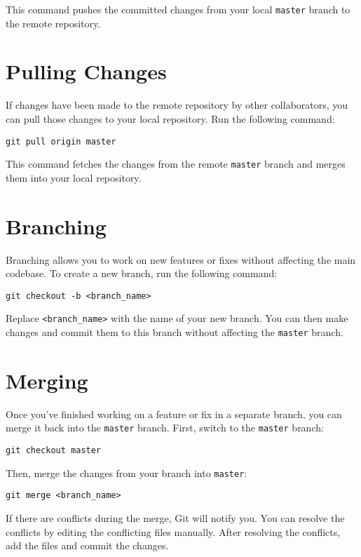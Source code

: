 \documentclass[10pt,twocolumn]{article}
\begin{document}
This command pushes the committed changes from your local \texttt{master} branch to the remote repository.

\section{Pulling Changes}

If changes have been made to the remote repository by other collaborators, you can pull those changes to your local repository. Run the following command:

\begin{verbatim}
git pull origin master
\end{verbatim}

This command fetches the changes from the remote \texttt{master} branch and merges them into your local repository.

\section{Branching}

Branching allows you to work on new features or fixes without affecting the main codebase. To create a new branch, run the following command:

\begin{verbatim}
git checkout -b <branch_name>
\end{verbatim}

Replace \texttt{<branch\_name>} with the name of your new branch. You can then make changes and commit them to this branch without affecting the \texttt{master} branch.

\section{Merging}

Once you've finished working on a feature or fix in a separate branch, you can merge it back into the \texttt{master} branch. First, switch to the \texttt{master} branch:

\begin{verbatim}
git checkout master
\end{verbatim}

Then, merge the changes from your branch into \texttt{master}:

\begin{verbatim}
git merge <branch_name>
\end{verbatim}

If there are conflicts during the merge, Git will notify you. You can resolve the conflicts by editing the conflicting files manually. After resolving the conflicts, add the files and commit the changes.
\end{document}
